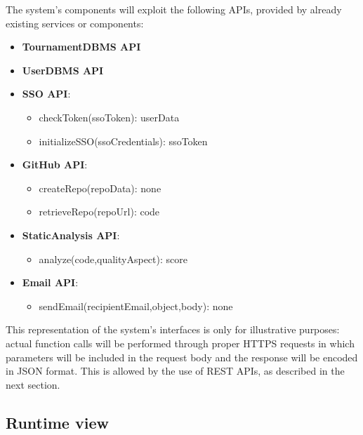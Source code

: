 The system's components will exploit the following APIs, provided by already existing services or components:
\begin{itemize}
    \item \textbf{TournamentDBMS API}
    \item \textbf{UserDBMS API}
    \item \textbf{SSO API}:
    \begin{itemize}
        \item checkToken(ssoToken): userData
        \item initializeSSO(ssoCredentials): ssoToken
    \end{itemize}
    \item \textbf{GitHub API}: 
    \begin{itemize}
        \item createRepo(repoData): none
        \item retrieveRepo(repoUrl): code
    \end{itemize}
    \item \textbf{StaticAnalysis API}: 
    \begin{itemize}
        \item analyze(code,qualityAspect): score
    \end{itemize}
    \item \textbf{Email API}:
    \begin{itemize}
        \item sendEmail(recipientEmail,object,body): none
    \end{itemize}
\end{itemize}
This representation of the system's interfaces is only for illustrative purposes: actual function calls will be performed through proper HTTPS requests in which parameters will be included in the request body and the response will be encoded in JSON format. This is allowed by the use of REST APIs, as described in the next section.

\newpage
\subsection{Runtime view}


\newpage
